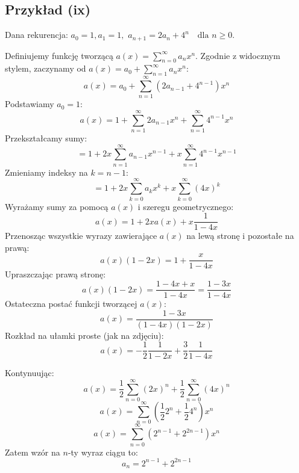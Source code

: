 \documentclass{mwart}
\begin{document}
\begin{mdframed}
    
\subsection*{Przykład (ix)}
Dana rekurencja:
$a_0 = 1, a_1 = 1,$
$a_{n+1} = 2a_n + 4^n \quad \text{dla } n \ge 0.$

Definiujemy funkcję tworzącą $a(x) = \sum_{n=0}^{\infty} a_n x^n$.
Zgodnie z widocznym stylem, zaczynamy od $a(x) = a_0 + \sum_{n=1}^{\infty} a_n x^n$:
$$ a(x) = a_0 + \sum_{n=1}^{\infty} (2a_{n-1} + 4^{n-1}) x^n $$
Podstawiamy $a_0 = 1$:
$$ a(x) = 1 + \sum_{n=1}^{\infty} 2a_{n-1} x^n + \sum_{n=1}^{\infty} 4^{n-1} x^n $$
Przekształcamy sumy:
$$ = 1 + 2x \sum_{n=1}^{\infty} a_{n-1} x^{n-1} + x \sum_{n=1}^{\infty} 4^{n-1} x^{n-1} $$
Zmieniamy indeksy na $k=n-1$:
$$ = 1 + 2x \sum_{k=0}^{\infty} a_k x^k + x \sum_{k=0}^{\infty} (4x)^k $$
Wyrażamy sumy za pomocą $a(x)$ i szeregu geometrycznego:
$$ a(x) = 1 + 2x a(x) + x \frac{1}{1-4x} $$
Przenosząc wszystkie wyrazy zawierające $a(x)$ na lewą stronę i pozostałe na prawą:
$$ a(x) (1 - 2x) = 1 + \frac{x}{1-4x} $$
Upraszczając prawą stronę:
$$ a(x) (1 - 2x) = \frac{1-4x+x}{1-4x} = \frac{1-3x}{1-4x} $$
Ostateczna postać funkcji tworzącej $a(x)$:
$$ a(x) = \frac{1-3x}{(1-4x)(1-2x)} $$
Rozkład na ułamki proste (jak na zdjęciu):
$$ a(x) = -\frac{1}{2} \frac{1}{1-2x} + \frac{3}{2} \frac{1}{1-4x} $$

Kontynuując:
$$ a(x) = \frac{1}{2} \sum_{n=0}^{\infty} (2x)^n + \frac{1}{2} \sum_{n=0}^{\infty} (4x)^n $$
$$ a(x) = \sum_{n=0}^{\infty} \left( \frac{1}{2} 2^n + \frac{1}{2} 4^n \right) x^n $$
$$ a(x) = \sum_{n=0}^{\infty} (2^{n-1} + 2^{2n-1}) x^n $$
Zatem wzór na $n$-ty wyraz ciągu to:
$$ a_n = 2^{n-1} + 2^{2n-1} $$

\end{mdframed}
%
\end{document}
